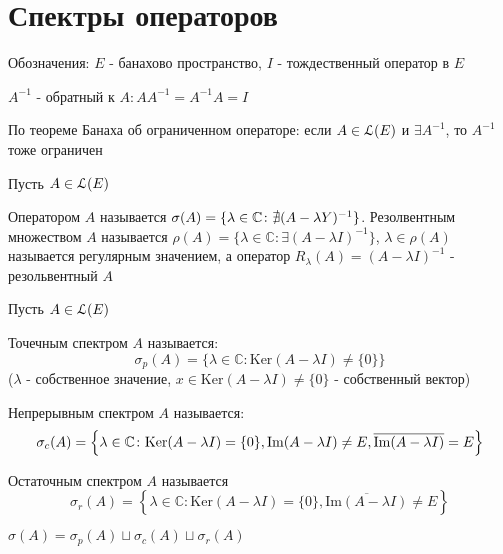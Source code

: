 \documentclass[a4paper,12pt]{report}
\newcommand*{\hm}[1]{#1\nobreak\discretionary{}%
            {\hbox{$\mathsurround=0pt #1$}}{}}
\begin{document}
\chapter{Спектры операторов}

Обозначения: $E$ - банахово пространство, $I$ - тождественный оператор в $E$

$A^{-1}$ - обратный к $A\colon AA^{-1}=A^{-1}A=I$

По теореме Банаха об ограниченном операторе: если $A\in\EuScript L(E)$ и $\exists A^{-1}$, то $A^{-1}$ тоже ограничен
 

\begin{df}
Пусть $A\in\EuScript L(E)$

Оператором $A$ называется $\sigma(A)=\{\lambda\hm\in\mathbb C\colon\nexists(A-\lambda Y)^{-1}\}$. Резолвентным множеством $A$ называется $\rho(A)=\{\lambda\in\mathbb C\colon\exists(A-\lambda I)^{-1}\}$, $\lambda\in\rho(A)$ называется регулярным значением, а оператор $R_\lambda(A)=(A-\lambda I)^{-1}$ - резольвентный $A$
\end{df}
 


\begin{df}
Пусть $A\in\EuScript L(E)$

Точечным спектром $A$ называется: 
\begin{equation*}\sigma_p(A)=\Big\{\lambda\in\mathbb C\colon\mathrm{Ker}(A-\lambda I)\ne\{0\}\Big\}\end{equation*} ($\lambda$ - собственное значение, $x\in\mathrm{Ker}(A-\lambda I)\ne\{0\}$ - собственный вектор)

Непрерывным спектром $A$ называется: 
\begin{equation*}\sigma_c(A)=\left\{\lambda\in\mathbb C\colon\mathrm{Ker}(A-\lambda I)=\{0\},\\ \mathrm{Im}(A-\lambda I)\ne E,\overline{\mathrm{Im}(A-\lambda I)}=E\right\}\end{equation*}

Остаточным спектром $A$ называется 
\begin{equation*}\sigma_r(A)=\left\{\lambda\in\mathbb C\colon\mathrm{Ker}(A-\lambda I)=\{0\},\overline{\mathrm{Im}(A-\lambda I)}\ne E\right\}\end{equation*} 
\end{df}
 


\begin{rem}
$\sigma(A)=\sigma_p(A)\sqcup\sigma_c(A)\sqcup\sigma_r(A)$
\end{rem}
 
\end{document}
